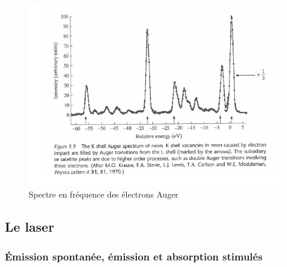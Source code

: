 \begin{figure}[tph]
    \centering
    \includegraphics[scale=1.0]{Images2/Spectre Auger.PNG}
    \caption{Spectre en fréquence des électrons Auger}
    \label{fig:SpectreAuger}
\end{figure}








\subsection{Le laser}

\subsubsection{Émission spontanée, émission et absorption stimulés}




